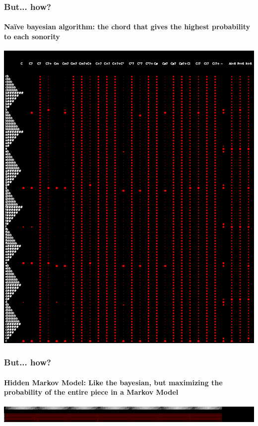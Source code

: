 \documentclass{beamer}
\begin{document}
\begin{frame}
  \frametitle{But... how?}
  \framesubtitle{Naïve bayesian algorithm: the chord that gives the highest
    probability to each sonority}
  \addvspace{0.5em}
  \includegraphics[scale=0.4, trim = 6em 0 0 0]{figs/notesprobs}
\end{frame}

\begin{frame}
  \frametitle{But... how?}
  \framesubtitle{Hidden Markov Model: Like the bayesian, but
    maximizing the probability of the entire piece in a Markov Model}
  \includegraphics[scale=0.4, trim = 6em 0 0 0]{figs/transprobs}
\end{frame}
\end{document}
